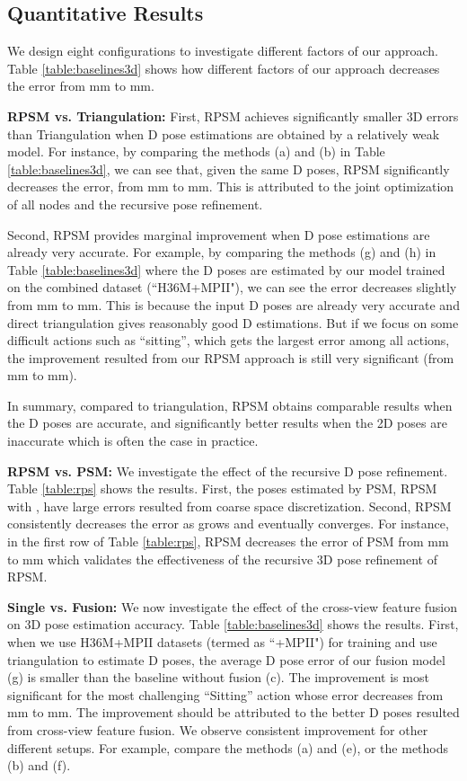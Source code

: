\documentclass[10pt,twocolumn,letterpaper]{article}
\begin{document}
\subsection{Quantitative Results}
We design eight configurations to investigate different factors of our approach. Table \ref{table:baselines3d} shows how different factors of our approach decreases the error from mm to mm.

\textbf{RPSM vs. Triangulation:}
 First, RPSM achieves significantly smaller 3D errors than Triangulation when D pose estimations are obtained by a relatively weak model. For instance, by comparing the methods (a) and (b) in Table \ref{table:baselines3d}, we can see that, given the same D poses, RPSM significantly decreases the error, \ie from mm to mm. This is attributed to the joint optimization of all nodes and the recursive pose refinement. 

Second, RPSM provides marginal improvement when D pose estimations are already very accurate. For example, by comparing  the methods (g) and (h) in Table \ref{table:baselines3d} where the D poses are estimated by our model trained on the combined dataset (``H36M+MPII"), we can see the error decreases slightly from mm to mm. This is because the input D poses are already very accurate and direct triangulation gives reasonably good D estimations. But if we focus on some difficult actions such as ``sitting'', which gets the largest error among all actions, the improvement resulted from our RPSM approach is still very significant (from mm to mm). 

In summary, compared to triangulation, RPSM obtains comparable results when the D poses are accurate, and significantly better results when the 2D poses are inaccurate which is often the case in practice.




\textbf{RPSM vs. PSM: }
We investigate the effect of the recursive D pose refinement. Table \ref{table:rps} shows the results. First, the poses estimated by PSM, \ie RPSM with , have large errors resulted from coarse space discretization. Second, RPSM consistently decreases the error as  grows and eventually converges.
For instance, in the first row of Table \ref{table:rps}, RPSM decreases the error of PSM from mm to mm which validates the effectiveness of the recursive 3D pose refinement of RPSM.




\textbf{Single vs. Fusion: }
We now investigate the effect of the cross-view feature fusion on 3D pose estimation accuracy. Table \ref{table:baselines3d} shows the results. First, when we use H36M+MPII datasets (termed as ``+MPII") for training and use triangulation to estimate D poses, the average D pose error of our fusion model (g) is smaller than the baseline without fusion (c). The improvement is most significant for the most challenging ``Sitting'' action whose error decreases from mm to mm. The improvement should be attributed to the better D poses resulted from cross-view feature fusion. We observe consistent improvement for other different setups. For example, compare the methods (a) and (e), or the methods (b) and (f).
\end{document}
